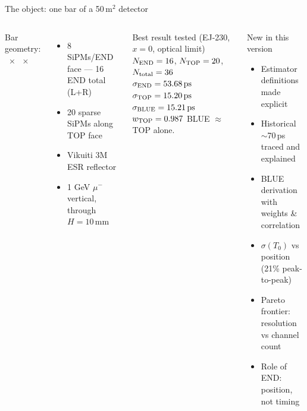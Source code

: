 \documentclass[aspectratio=169,9pt]{beamer}
\newcommand{\sigT}{\sigma(T_0)}
\newcommand{\sE}{\sigma_{\mathrm{END}}}
\newcommand{\sT}{\sigma_{\mathrm{TOP}}}
\newcommand{\sB}{\sigma_{\mathrm{BLUE}}}
\newcommand{\wTOPval}{0.987}
\begin{document}
\begin{frame}{The object: one bar of a 50\,m$^2$ detector}
  \begin{columns}[T]
      {\small Bar geometry: \NapLmm\ $\times$ \NapWmm\ $\times$ \NapHmm}\\[4pt]
      \begin{itemize}\setlength\itemsep{2pt}
        \item[$\bullet$] 8 SiPMs/END face — 16 END total (L+R)
        \item[$\bullet$] 20 sparse SiPMs along TOP face
        \item[$\bullet$] Vikuiti 3M ESR reflector
        \item[$\bullet$] 1 GeV $\mu^-$ vertical, through $H=10$\,mm
      \end{itemize}
      \vspace{5pt}
      \begin{block}{Best result tested  (EJ-230, $x=0$, optical limit)}
        {\footnotesize
        $N_{\rm END}=16$, $N_{\rm TOP}=20$, $N_{\rm total}=36$\\[2pt]
        $\sE=\NapsigmaENDbestps$\quad
        $\sT=\NapsigmaTOPbestps$\quad
        $\sB=\NapsigmaBLUEbestps$\\[2pt]
        $w_{\rm TOP}=\wTOPval$ \quad BLUE $\approx$ TOP alone.}
      \end{block}
      \begin{alertblock}{New in this version}
        {\footnotesize
        \begin{itemize}\setlength\itemsep{2pt}
          \item Estimator definitions made explicit
          \item Historical $\sim$70\,ps traced and explained
          \item BLUE derivation with weights \& correlation
          \item $\sigT$ vs position (21\% peak-to-peak)
          \item Pareto frontier: resolution vs channel count
          \item Role of END: position, not timing
        \end{itemize}}
      \end{alertblock}
  \end{columns}
\end{frame}
\end{document}
